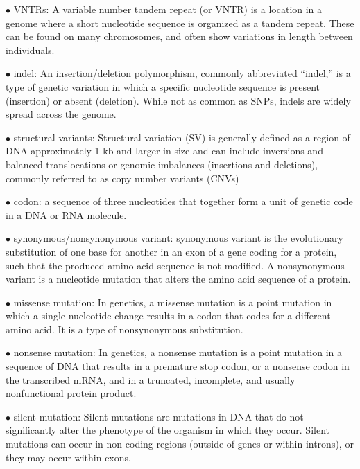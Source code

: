 \documentclass{article}
\begin{document}
\vspace{0.1in}
$\bullet$ VNTRs:
A variable number tandem repeat (or VNTR) is a location in a genome where a short nucleotide sequence is organized as a tandem repeat. These can be found on many chromosomes, and often show variations in length between individuals.


\vspace{0.1in}
$\bullet$ indel:
An insertion/deletion polymorphism, commonly abbreviated “indel,” is a type of genetic variation in which a specific nucleotide sequence is present (insertion) or absent (deletion). While not as common as SNPs, indels are widely spread across the genome.


\vspace{0.1in}
$\bullet$ structural variants:
Structural variation (SV) is generally defined as a region of DNA approximately 1 kb and larger in size and can include inversions and balanced translocations or genomic imbalances (insertions and deletions), commonly referred to as copy number variants (CNVs)


\vspace{0.1in}
$\bullet$ codon:
a sequence of three nucleotides that together form a unit of genetic code in a DNA or RNA molecule.


\vspace{0.1in}
$\bullet$ synonymous/nonsynonymous variant:
synonymous variant is the evolutionary substitution of one base for another in an exon of a gene coding for a protein, such that the produced amino acid sequence is not modified.
A nonsynonymous variant is a nucleotide mutation that alters the amino acid sequence of a protein.


\vspace{0.1in}
$\bullet$ missense mutation:
In genetics, a missense mutation is a point mutation in which a single nucleotide change results in a codon that codes for a different amino acid. It is a type of nonsynonymous substitution.


\vspace{0.1in}
$\bullet$ nonsense mutation:
In genetics, a nonsense mutation is a point mutation in a sequence of DNA that results in a premature stop codon, or a nonsense codon in the transcribed mRNA, and in a truncated, incomplete, and usually nonfunctional protein product.


\vspace{0.1in}
$\bullet$ silent mutation:
Silent mutations are mutations in DNA that do not significantly alter the phenotype of the organism in which they occur. Silent mutations can occur in non-coding regions (outside of genes or within introns), or they may occur within exons.
\end{document}
